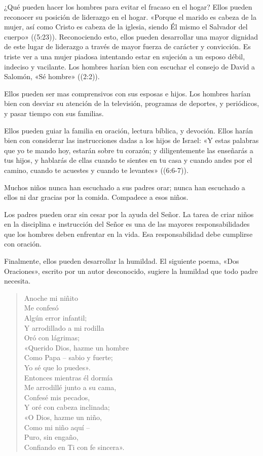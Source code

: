 \documentclass[12pt, twoside, openright]{book}
\begin{document}
¿Qué pueden hacer los hombres para evitar el fracaso en el hogar? Ellos pueden reconocer su posición de liderazgo en el hogar. «Porque el marido es cabeza de la mujer, así como Cristo es cabeza de la iglesia, siendo Él mismo el Salvador del cuerpo» ((5:23)). Reconociendo esto, ellos pueden desarrollar una mayor dignidad de este lugar de liderazgo a través de mayor fuerza de carácter y convicción. Es triste ver a una mujer piadosa intentando estar en sujeción a un esposo débil, indeciso y vacilante. Los hombres harían bien con escuchar el consejo de David a Salomón, «Sé hombre» ((2:2)).

Ellos pueden ser mas comprensivos con sus esposas e hijos. Los hombres harían bien con desviar su atención de la televisión, programas de deportes, y periódicos, y pasar tiempo con sus familias. 

Ellos pueden guiar la familia en oración, lectura bíblica, y devoción. Ellos harán bien con considerar las instrucciones dadas a los hijos de Israel: «Y estas palabras que yo te mando hoy, estarán sobre tu corazón; y diligentemente las enseñarás a tus hijos, y hablarás de ellas cuando te sientes en tu casa y cuando andes por el camino, cuando te acuestes y cuando te levantes» ((6:6-7)).

Muchos niños nunca han escuchado a sus padres orar; nunca han escuchado a ellos ni dar gracias por la comida. Compadece a esos niños.

Los padres pueden orar sin cesar por la ayuda del Señor. La tarea de criar niños en la disciplina e instrucción del Señor es una de las mayores responsabilidades que los hombres deben enfrentar en la vida. Esa responsabilidad debe cumplirse con oración.

Finalmente, ellos pueden desarrollar la humildad. El siguiente poema, «Dos Oraciones», escrito por un autor desconocido, sugiere la humildad que todo padre necesita.
\begin{flushleft}\begin{verse}
Anoche mi niñito\\
Me confesó\\
Algún error infantil;\\
Y arrodillado a mi rodilla\\
Oró con lágrimas;\\
«Querido Dios, hazme un hombre\\
Como Papa – sabio y fuerte;\\
Yo sé que lo puedes».\\
Entonces mientras él dormía\\
Me arrodillé junto a su cama,\\
Confesé mis pecados,\\
Y oré con cabeza inclinada;\\
«O Dios, hazme un niño,\\
Como mi niño aquí – \\
Puro, sin engaño,\\
Confiando en Ti con fe sincera».\\
\end{verse}\end{flushleft}
\end{document}
